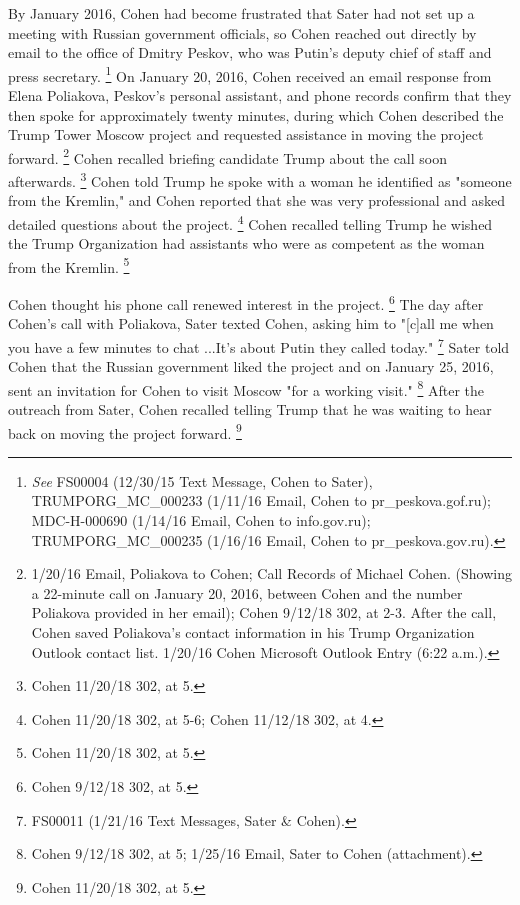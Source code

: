 {By January 2016, Cohen had become frustrated that Sater had not set up a meeting with Russian government officials, so Cohen reached out directly by email to the office of Dmitry Peskov, who was Putin's deputy chief of staff and press secretary.%
\footnote{\textit{See} FS00004 (12/30/15 Text Message, Cohen to Sater), TRUMPORG\_MC\_000233 (1/11/16 Email, Cohen to pr\_peskova\@prpress.gof.ru);
MDC-H-000690 (1/14/16 Email, Cohen to info\@prpress.gov.ru);
TRUMPORG\_MC\_000235 (1/16/16 Email, Cohen to pr\_peskova\@prpress.gov.ru).}
On January 20, 2016, Cohen received an email response from Elena Poliakova, Peskov's personal assistant, and phone records confirm that they then spoke for approximately twenty minutes, during which Cohen described the Trump Tower Moscow project and requested assistance in moving the project forward.%
\footnote{1/20/16 Email, Poliakova to Cohen;
Call Records of Michael Cohen.
(Showing a 22-minute call on January 20, 2016, between Cohen and the number Poliakova provided in her email);
Cohen 9/12/18 302, at 2-3.
After the call, Cohen saved Poliakova’s contact information in his Trump Organization Outlook contact list.
1/20/16 Cohen Microsoft Outlook Entry (6:22 a.m.).}
Cohen recalled briefing candidate Trump about the call soon afterwards.%
\footnote{Cohen 11/20/18 302, at 5.}
Cohen told Trump he spoke with a woman he identified as "someone from the Kremlin," and Cohen reported that she was very professional and asked detailed questions about the project.%
\footnote{Cohen 11/20/18 302, at 5-6;
Cohen 11/12/18 302, at 4.}
Cohen recalled telling Trump he wished the Trump Organization had assistants who were as competent as the woman from the Kremlin.%
\footnote{Cohen 11/20/18 302, at 5.}

Cohen thought his phone call renewed interest in the project.%
\footnote{Cohen 9/12/18 302, at 5.}
The day after Cohen's call with Poliakova, Sater texted Cohen, asking him to "[c]all me when you have a few minutes to chat ...It's about Putin they called today."%
\footnote{FS00011 (1/21/16 Text Messages, Sater \& Cohen).}
Sater told Cohen that the Russian government liked the project and on January 25, 2016, sent an invitation for Cohen to visit Moscow "for a working visit."%
\footnote{Cohen 9/12/18 302, at 5;
1/25/16 Email, Sater to Cohen (attachment).}
After the outreach from Sater, Cohen recalled telling Trump that he was waiting to hear back on moving the project forward.%
\footnote{Cohen 11/20/18 302, at 5.}

}
